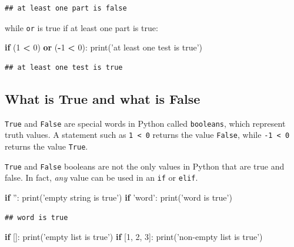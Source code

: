 \documentclass[]{book}
\newenvironment{Shaded}{\begin{snugshade}}{\end{snugshade}}
\newcommand{\BuiltInTok}[1]{#1}
\newcommand{\ControlFlowTok}[1]{\textcolor[rgb]{0.13,0.29,0.53}{\textbf{#1}}}
\newcommand{\DecValTok}[1]{\textcolor[rgb]{0.00,0.00,0.81}{#1}}
\newcommand{\KeywordTok}[1]{\textcolor[rgb]{0.13,0.29,0.53}{\textbf{#1}}}
\newcommand{\NormalTok}[1]{#1}
\newcommand{\OperatorTok}[1]{\textcolor[rgb]{0.81,0.36,0.00}{\textbf{#1}}}
\newcommand{\StringTok}[1]{\textcolor[rgb]{0.31,0.60,0.02}{#1}}
\theoremstyle{definition}
\theoremstyle{definition}
\theoremstyle{definition}
\theoremstyle{remark}
\begin{document}
\begin{verbatim}
## at least one part is false
\end{verbatim}

while \texttt{or} is true if at least one part is true:

\begin{Shaded}
\begin{Highlighting}[]
\ControlFlowTok{if}\NormalTok{ (}\DecValTok{1} \OperatorTok{<} \DecValTok{0}\NormalTok{) }\KeywordTok{or}\NormalTok{ (}\OperatorTok{-}\DecValTok{1} \OperatorTok{<} \DecValTok{0}\NormalTok{):}
    \BuiltInTok{print}\NormalTok{(}\StringTok{'at least one test is true'}\NormalTok{)}
\end{Highlighting}
\end{Shaded}

\begin{verbatim}
## at least one test is true
\end{verbatim}

\hypertarget{what-is-true-and-what-is-false}{%
\subsection{What is True and what is
False}\label{what-is-true-and-what-is-false}}

\texttt{True} and \texttt{False} are special words in Python called
\texttt{booleans}, which represent truth values. A statement such as
\texttt{1\ \textless{}\ 0} returns the value \texttt{False}, while
\texttt{-1\ \textless{}\ 0} returns the value \texttt{True}.

\texttt{True} and \texttt{False} booleans are not the only values in
Python that are true and false. In fact, \emph{any} value can be used in
an \texttt{if} or \texttt{elif}.

\begin{Shaded}
\begin{Highlighting}[]
\ControlFlowTok{if} \StringTok{''}\NormalTok{:}
    \BuiltInTok{print}\NormalTok{(}\StringTok{'empty string is true'}\NormalTok{)}
\ControlFlowTok{if} \StringTok{'word'}\NormalTok{:}
    \BuiltInTok{print}\NormalTok{(}\StringTok{'word is true'}\NormalTok{)}
\end{Highlighting}
\end{Shaded}

\begin{verbatim}
## word is true
\end{verbatim}

\begin{Shaded}
\begin{Highlighting}[]
\ControlFlowTok{if}\NormalTok{ []:}
    \BuiltInTok{print}\NormalTok{(}\StringTok{'empty list is true'}\NormalTok{)}
\ControlFlowTok{if}\NormalTok{ [}\DecValTok{1}\NormalTok{, }\DecValTok{2}\NormalTok{, }\DecValTok{3}\NormalTok{]:}
    \BuiltInTok{print}\NormalTok{(}\StringTok{'non-empty list is true'}\NormalTok{)}
\end{Highlighting}
\end{Shaded}
\end{document}

